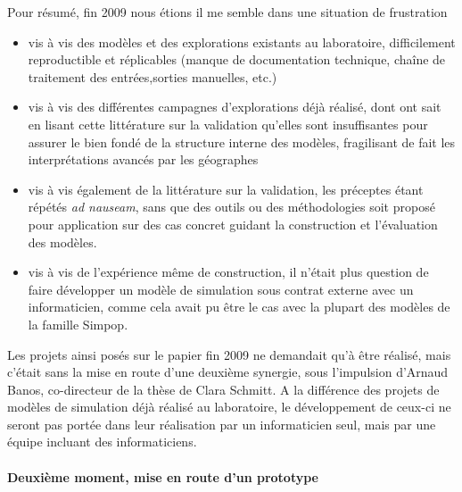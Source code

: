 Pour résumé, fin 2009 nous étions il me semble dans une situation de frustration 
\begin{itemize}[noitemsep,nolistsep]
\item  vis à vis des modèles et des explorations existants au laboratoire, difficilement reproductible et réplicables (manque de documentation technique, chaîne de traitement des entrées,sorties manuelles, etc.)

\item vis à vis des différentes campagnes d'explorations déjà réalisé, dont ont sait en lisant cette littérature sur la validation qu'elles sont insuffisantes pour assurer le bien fondé de la structure interne des modèles, fragilisant de fait les interprétations avancés par les géographes 

\item vis à vis également de la littérature sur la validation, les préceptes étant répétés \textit{ad nauseam}, sans que des outils ou des méthodologies soit proposé pour application sur des cas concret guidant la construction et l'évaluation des modèles. 

\item vis à vis de l'expérience même de construction, il n'était plus question de faire développer un modèle de simulation sous contrat externe avec un informaticien, comme cela avait pu être le cas avec la plupart des modèles de la famille Simpop. %

\end{itemize}

Les projets ainsi posés sur le papier fin 2009 ne demandait qu'à être réalisé, mais c'était sans la mise en route d'une deuxième synergie, sous l'impulsion d'Arnaud Banos, co-directeur de la thèse de Clara Schmitt. A la différence des projets de modèles de simulation déjà réalisé au laboratoire, le développement de ceux-ci ne seront pas portée dans leur réalisation par un informaticien seul, mais par une équipe incluant des informaticiens.

\paragraph{Deuxième moment, mise en route d'un prototype}

